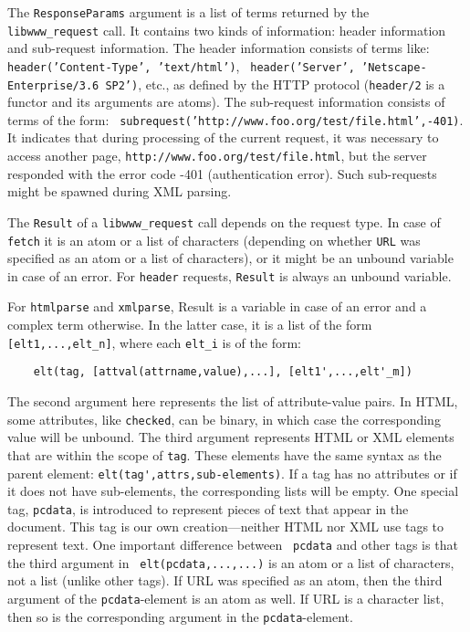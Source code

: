 The {\tt ResponseParams} argument is a list of terms returned by the {\tt
  libwww\_request} call. It contains two kinds of information: header
information and sub-request information. The header information consists of
terms like: {\tt header('Content-Type', 'text/html')}, {\tt
  header('Server', 'Netscape-Enterprise/3.6 SP2')}, etc., as defined by the
HTTP protocol ({\tt header/2} is a functor and its arguments are atoms).
The sub-request information consists of terms of the form: {\tt
  subrequest('http://www.foo.org/test/file.html',-401)}. It indicates that
during processing of the current request, it was necessary to access
another page, {\tt http://www.foo.org/test/file.html}, but the server
responded with the error code -401 (authentication error).
Such sub-requests might be spawned during XML parsing.

The {\tt Result} of a {\tt libwww\_request} call depends on the request type.
In case of {\tt fetch} it is an atom or a list of characters (depending on
whether {\tt URL} was specified as an atom or a list of characters), or it
might be an unbound variable in case of an error. For {\tt header}
requests, {\tt Result} is always an unbound variable.

For {\tt htmlparse} and {\tt xmlparse}, Result is a variable in case of an
error and a complex term otherwise. In the latter case, it is a list of the
form {\tt [elt1,...,elt\_n]}, where each {\tt elt\_i} is of the form:
\begin{verbatim}
    elt(tag, [attval(attrname,value),...], [elt1',...,elt'_m])
\end{verbatim}
The second argument here represents the list of attribute-value pairs.  In
HTML, some attributes, like {\tt checked}, can be binary, in which case the
corresponding value will be unbound. The third argument represents
HTML or XML elements that are within the scope of {\tt tag}. These elements
have the same syntax as the parent element:
\verb|elt(tag',attrs,sub-elements)|. If a tag has no attributes or if
it does not have sub-elements, the corresponding lists will be empty.
One special tag, {\tt pcdata}, is introduced to represent pieces of text
that appear in the document. This tag is our own creation---neither HTML
nor XML use tags to represent text. One important difference between {\tt
  pcdata} and other tags is that the third argument in {\tt
  elt(pcdata,...,...)} is an atom or a list of characters, not a list
(unlike other tags). If URL was specified as an atom, then the third
argument of the {\tt pcdata}-element is an atom as well. If URL is a
character list, then so is the corresponding argument in the
{\tt pcdata}-element.

